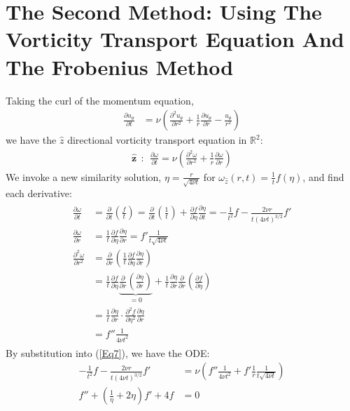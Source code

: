 \documentclass{article}
\begin{document}
\section{The Second Method: Using The Vorticity Transport Equation And The Frobenius Method}
Taking the curl of the momentum equation,
\begin{align*}
    \frac{\partial u_\theta}{\partial t}&=\nu \left(\frac{\partial^2 u_\theta}{\partial r^2}+\frac{1}{r}\frac{\partial u_\theta}{\partial r} -\frac{u_\theta}{r^2}\right)
\end{align*}
we have the $\hat{z}$ directional vorticity transport equation in $\mathbb{R}^2$:
\begin{align}\label{Eq7}
    \boldsymbol{\hat{z}}\:\: : \:\: \frac{\partial \omega}{\partial t}=\nu \left(\frac{\partial^2 \omega}{\partial r^2}+\frac{1}{r}\frac{\partial \omega}{\partial r}\right)
\end{align}
We invoke a new similarity solution, $\eta =\frac{r}{\sqrt{4\nu t}}$ for $\omega_{\hat{z}} (r,t)=\frac{1}{t}f(\eta)$, and find each derivative:
\begin{align}\label{Eq8}
\begin{split}
    \frac{\partial \omega}{\partial t} &= \frac{\partial }{\partial t}\left(\frac{f}{t} \right)=\frac{\partial}{\partial t}\left(\frac{1}{t}\right) +\frac{\partial f}{\partial \eta}\frac{\partial \eta}{\partial t} = -\frac{1}{t^2}f-\frac{2\nu r}{t(4\nu t)^{3/2}}f'\\
    \frac{\partial \omega}{\partial r} &=\frac{1}{t}\frac{\partial f}{\partial \eta}\frac{\partial \eta}{\partial r} = f' \frac{1}{t\sqrt{4\nu t}}\\
    \frac{\partial^2 \omega}{\partial r^2} &=\frac{\partial }{\partial r}\left( \frac{1}{t}\frac{\partial f}{\partial \eta}\frac{\partial \eta}{\partial r} \right) \\
    &=\frac{1}{t}\frac{\partial f}{\partial \eta}\underbrace{\frac{\partial}{\partial r}\left ( \frac{\partial \eta}{\partial r} \right ) }_{=0}
    + \frac{1}{t}\frac{\partial \eta}{\partial r}\frac{\partial }{\partial r}\left ( \frac{\partial f}{\partial \eta} \right ) \\
    &= \frac{1}{t}\frac{\partial \eta}{\partial r} \cdot \frac{\partial^2 f}{\partial \eta^2} \frac{\partial \eta}{\partial r}\\
    &= f'' \frac{1}{4\nu t^2}
\end{split}
\end{align}
By substitution into (\ref{Eq7}), we have the ODE:
\begin{align*}
    -\frac{1}{t^2}f-\frac{2\nu r}{t(4\nu t)^{3/2}}f' &= \nu \left(f'' \frac{1}{4\nu t^2}+ f' \frac{1}{r}\frac{1}{t\sqrt{4\nu t}} \right)\\
    f'' + \left(\frac{1}{\eta}+2\eta \right)f' +4f &= 0
\end{align*}
\end{document}
